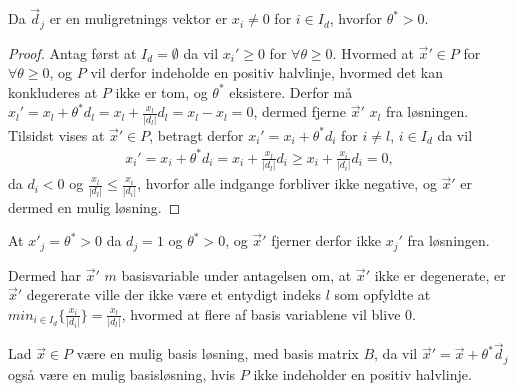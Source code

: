 \begin{bem}
Da $\vec{d}_j$ er en muligretnings vektor er $x_i\neq 0$ for $i \in I_d$, hvorfor $\theta^* > 0$.
\end{bem}
\begin{proof}
Antag først at $I_d = \emptyset$ da vil $x_i' \geq 0$ for $\forall \theta \geq 0$. 
Hvormed at $\vec{x}' \in P$ for $\forall \theta \geq 0$, og $P$ vil derfor indeholde en positiv halvlinje, hvormed det kan konkluderes at $P$ ikke er tom, og $\theta^*$ eksistere.
Derfor må $x_l' = x_l + \theta^* d_l = x_l + \frac{x_l}{|d_l|}d_l = x_l - x_l = 0$, dermed fjerne $\vec{x}'$ $x_l$ fra løsningen.
Tilsidst vises at $\vec{x}' \in P$, betragt derfor $x_i' = x_i + \theta^* d_i$ for $i \neq l$, $i \in I_d$ da vil
\begin{align*}
x_i' = x_i + \theta^* d_i = x_i + \frac{x_l}{|d_l|}d_i \geq x_i + \frac{x_i}{|d_i|}d_i = 0,
\end{align*}
da $d_i < 0$ og $\frac{x_l}{|d_l|} \leq \frac{x_i}{|d_i|}$, hvorfor alle indgange forbliver ikke negative, og $\vec{x}'$ er dermed en mulig løsning.
\end{proof}
\begin{bem}
At $x'_j = \theta^* >  0$ da $d_j = 1$ og $\theta^* > 0$, og $\vec{x}'$ fjerner derfor ikke $x_j'$ fra løsningen.
\end{bem}
Dermed har $\vec{x}'$ $m$ basisvariable under antagelsen om, at $\vec{x}'$ ikke er degenerate, er $\vec{x}'$ degererate ville der ikke være et entydigt indeks $l$ som opfyldte at $min_{i \in I_d}\{\frac{x_i}{|d_i|}\}=\frac{x_l}{|d_l|}$, hvormed at flere af basis variablene  vil blive 0. 
\begin{stn}
Lad $\vec{x}\in P$ være en mulig basis løsning, med basis matrix $B$, da vil $\vec{x}' = \vec{x}+ \theta^*\vec{d}_j$ også være en mulig basisløsning, hvis $P$ ikke indeholder en positiv halvlinje.
\end{stn}
